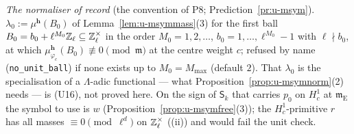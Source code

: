 \documentclass[11pt]{article}
\newcommand{\Iw}{\Lambda}                         %
\newcommand{\hcusp}{\mathbf{h}}                   %
\newcommand{\Eis}{\mathrm{E}}
\newcommand{\Zl}{\Z_\ell}
\begin{document}
\noindent\emph{The normaliser of record} (the convention of P8; Prediction~\ref{pr:u-msym}). $\lambda_0:=\mu^{\hcusp}(B_0)$ of Lemma~\ref{lem:u-msymmass}(3) for the first ball
$B_0=b_0+\ell^{M_0}\Zl\subseteq\Zl^{\times}$ in the order $M_0=1,2,\dots$, $b_0=1,\dots,\ell^{M_0}-1$ with $\ell\nmid b_0$, at which $\mu^{\hcusp}_{\varphi_c}(B_0)\not\equiv0\pmod{\mathfrak m}$ at the
centre weight $c$; refused by name (\texttt{no\_unit\_ball}) if none exists up to $M_0=M_{\max}$ (default $2$). That $\lambda_0$ is the specialisation of a $\Iw$-adic functional --- what
Proposition~\ref{prop:u-msymnorm}(2) needs --- is (U16), not proved here. On the sign of $\mathsf S_k$ that carries $p_0$ on $H^{1}_c$ at $\mathfrak m_\Eis$ the symbol to use is $w$
(Proposition~\ref{prop:u-msymfree}(3)); the $H^{1}_c$-primitive $r$ has all masses $\equiv0\pmod{\ell^{d}}$ on $\Zl^{\times}$ ((ii)) and would fail the unit check.
\end{document}
